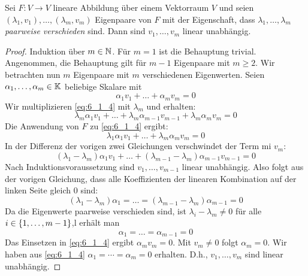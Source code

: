 \begin{lm}
	Sei $F: V \to V$ lineare Abbildung über einem Vektorraum $V$ und
	seien $ (\lambda_1,v_1), \ldots, (\lambda_m,v_m) $ Eigenpaare von $ F $ mit der Eigenschaft, dass $ \lambda_1, \ldots, \lambda_m $ \emph{paarweise verschieden} sind. Dann sind $ v_1, \ldots, v_m $ linear unabhängig.
\end{lm}
\begin{proof}
	Induktion über $ m \in \mathbb N $. Für $ m = 1 $ ist die Behauptung trivial. Angenommen, die Behauptung gilt für $ m-1 $ Eigenpaare mit $m \ge 2$. Wir betrachten nun $m$ Eigenpaare mit $m$ verschiedenen Eigenwerten. Seien $ \alpha_1, \ldots, \alpha_m \in \mathbb K $ beliebige Skalare mit
	\begin{equation}
		\alpha_1v_1 + \ldots + \alpha_mv_m = 0
		\label{eq:6_1_4}
	\end{equation}
	Wir multiplizieren \eqref{eq:6_1_4} mit $ \lambda_m $ und erhalten:
	\begin{equation*}
		\lambda_m\alpha_1v_1 + \ldots + \lambda_m\alpha_{m-1}v_{m-1} + \lambda_m\alpha_mv_m = 0
	\end{equation*}
	Die Anwendung von $ F $ zu \eqref{eq:6_1_4} ergibt:
	\begin{equation*}
		\lambda_1\alpha_1v_1 + \ldots + \lambda_m\alpha_mv_m = 0
	\end{equation*}
	In der Differenz der vorigen zwei Gleichungen verschwindet der Term mi $v_m$:
	\begin{equation*}
		(\lambda_1 - \lambda_m)\alpha_1v_1 + \ldots + (\lambda_{m-1} - \lambda_m)\alpha_{m-1}v_{m-1} = 0
	\end{equation*}
	Nach Induktionsvoraussetzung sind $ v_1, \ldots, v_{m-1} $ linear unabhängig. Also folgt aus der vorigen Gleichung, dass alle Koeffizienten der linearen Kombination auf der linken Seite gleich $0$ sind:
	\begin{equation*}
		(\lambda_1 - \lambda_m)\alpha_1 = \ldots = (\lambda_{m-1} - \lambda_m)\alpha_{m-1} = 0
	\end{equation*}
	Da die Eigenwerte paarweise verschieden sind, ist $ \lambda_i - \lambda_m \neq 0 $ für alle $ i \in \{ 1,\ldots,m-1 \} $,l erhält man
	\begin{equation*}
		\alpha_1 = \ldots = \alpha_{m-1} = 0
	\end{equation*}
	Das Einsetzen in \eqref{eq:6_1_4} ergibt $ \alpha_m v_m = 0 $. Mit $ v_m \neq 0 $ folgt $ \alpha_m = 0 $. Wir haben aus \eqref{eq:6_1_4} $\alpha_1 = \cdots = \alpha_m =0$ erhalten. D.h., $ v_1, \ldots, v_m $ sind linear unabhängig.
\end{proof}

